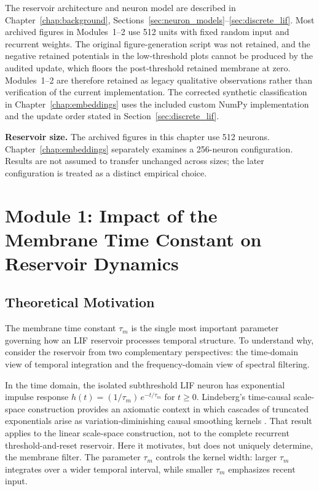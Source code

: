 The reservoir architecture and neuron model are described in Chapter~\ref{chap:background}, Sections~\ref{sec:neuron_models}--\ref{sec:discrete_lif}. Most archived figures in Modules~1--2 use 512 units with fixed random input and recurrent weights. The original figure-generation script was not retained, and the negative retained potentials in the low-threshold plots cannot be produced by the audited update, which floors the post-threshold retained membrane at zero. Modules~1--2 are therefore retained as legacy qualitative observations rather than verification of the current implementation. The corrected synthetic classification in Chapter~\ref{chap:embeddings} uses the included custom NumPy implementation and the update order stated in Section~\ref{sec:discrete_lif}.

\textbf{Reservoir size.} The archived figures in this chapter use 512 neurons. Chapter~\ref{chap:embeddings} separately examines a 256-neuron configuration. Results are not assumed to transfer unchanged across sizes; the later configuration is treated as a distinct empirical choice.


\section{Module 1: Impact of the Membrane Time Constant on Reservoir Dynamics}
\label{sec:module1}

\subsection{Theoretical Motivation}

The membrane time constant $\tau_m$ is the single most important parameter governing how an LIF reservoir processes temporal structure. To understand why, consider the reservoir from two complementary perspectives: the time-domain view of temporal integration and the frequency-domain view of spectral filtering.

In the time domain, the isolated subthreshold LIF neuron has exponential impulse response $h(t) = (1/\tau_m)\,e^{-t/\tau_m}$ for $t \geq 0$. Lindeberg's time-causal scale-space construction provides an axiomatic context in which cascades of truncated exponentials arise as variation-diminishing causal smoothing kernels \cite{lindeberg_2016}. That result applies to the linear scale-space construction, not to the complete recurrent threshold-and-reset reservoir. Here it motivates, but does not uniquely determine, the membrane filter. The parameter $\tau_m$ controls the kernel width: larger $\tau_m$ integrates over a wider temporal interval, while smaller $\tau_m$ emphasizes recent input.

